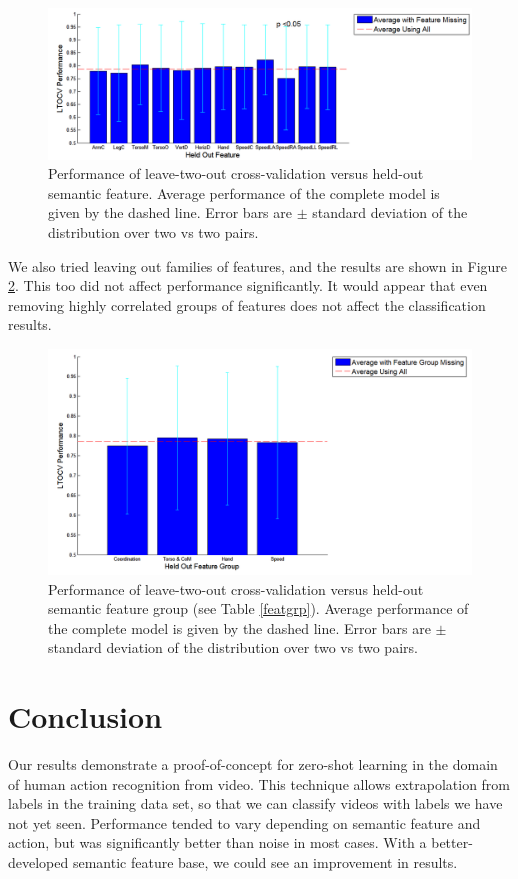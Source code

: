 \documentclass{article}
\begin{document}
\begin{figure}[h]
  \centering
  \includegraphics[width=.85\linewidth]{feature_snap}
  \caption{Performance of leave-two-out cross-validation versus held-out semantic feature. Average performance of the complete model is given by the dashed line. Error bars are $\pm$ standard deviation of the distribution over two vs two pairs.}
  \label{featplot}
\end{figure}

We also tried leaving out families of features, and the results are shown in Figure \ref{featgplot}.  This too did not affect performance significantly. It would appear that even removing highly correlated groups of features does not affect the classification results.

\begin{figure}[h]
  \centering
  \includegraphics[width=.85\linewidth]{featuregrp_snap}
  \caption{Performance of leave-two-out cross-validation versus held-out semantic feature group (see Table \ref{featgrp}). Average performance of the complete model is given by the dashed line. Error bars are $\pm$ standard deviation of the distribution over two vs two pairs.}
  \label{featgplot}
\end{figure}

\section{Conclusion}
Our results demonstrate a proof-of-concept for zero-shot learning in the domain of human action recognition from video. This technique allows extrapolation from labels in the training data set, so that we can classify videos with labels we have not yet seen.  Performance tended to vary depending on semantic feature and action, but was significantly better than noise in most cases. With a better-developed semantic feature base, we could see an improvement in results.



\end{document}

